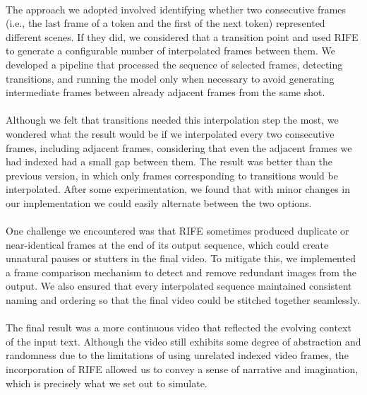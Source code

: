 \documentclass[runningheads]{llncs}
\begin{document}
\paragraph{}
The approach we adopted involved identifying whether two consecutive frames (i.e., the last frame of a token and the first of the next token) represented different scenes. If they did, we considered that a transition point and used RIFE to generate a configurable number of interpolated frames between them. We developed a pipeline that processed the sequence of selected frames, detecting transitions, and running the model only when necessary to avoid generating intermediate frames between already adjacent frames from the same shot.
\paragraph{}
Although we felt that transitions needed this interpolation step the most, we wondered what the result would be if we interpolated every two consecutive frames, including adjacent frames, considering that even the adjacent frames we had indexed had a small gap between them. The result was better than the previous version, in which only frames corresponding to transitions would be interpolated. After some experimentation, we found that with minor changes in our implementation we could easily alternate between the two options.
\paragraph{}
One challenge we encountered was that RIFE sometimes produced duplicate or near-identical frames at the end of its output sequence, which could create unnatural pauses or stutters in the final video. To mitigate this, we implemented a frame comparison mechanism to detect and remove redundant images from the output. We also ensured that every interpolated sequence maintained consistent naming and ordering so that the final video could be stitched together seamlessly.
\paragraph{}
The final result was a more continuous video that reflected the evolving context of the input text. Although the video still exhibits some degree of abstraction and randomness due to the limitations of using unrelated indexed video frames, the incorporation of RIFE allowed us to convey a sense of narrative and imagination, which is precisely what we set out to simulate.
\end{document}
